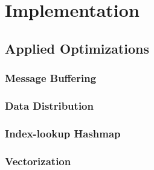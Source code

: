 \chapter{Implementation}
\label{ch:Implementation}

\section{Applied Optimizations}
\label{sec:AppliedOptimizations}

\subsection{Message Buffering}
\label{sec:MessageBuffering}

\subsection{Data Distribution}
\label{sec:DataDistribution}

\subsection{Index-lookup Hashmap}
\label{sec:IndexLookupHashmap}

\subsection{Vectorization}
\label{sec:Vectorization}